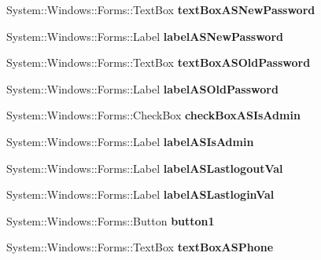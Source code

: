 \begin{DoxyCompactItemize}
System\+::\+Windows\+::\+Forms\+::\+Text\+Box {\bfseries text\+Box\+A\+S\+New\+Password}
\item 
\hypertarget{class_magazyn_1_1_magazin_afbf7075e643abcafff2222515f0fe7d4}{}\label{class_magazyn_1_1_magazin_afbf7075e643abcafff2222515f0fe7d4} 
System\+::\+Windows\+::\+Forms\+::\+Label {\bfseries label\+A\+S\+New\+Password}
\item 
\hypertarget{class_magazyn_1_1_magazin_a8aaa9dec27f0c20fff72fdb22c166982}{}\label{class_magazyn_1_1_magazin_a8aaa9dec27f0c20fff72fdb22c166982} 
System\+::\+Windows\+::\+Forms\+::\+Text\+Box {\bfseries text\+Box\+A\+S\+Old\+Password}
\item 
\hypertarget{class_magazyn_1_1_magazin_a015a4124ecc234517d562b01a70a0199}{}\label{class_magazyn_1_1_magazin_a015a4124ecc234517d562b01a70a0199} 
System\+::\+Windows\+::\+Forms\+::\+Label {\bfseries label\+A\+S\+Old\+Password}
\item 
\hypertarget{class_magazyn_1_1_magazin_a471146cf147a853a3861c6085941bfb6}{}\label{class_magazyn_1_1_magazin_a471146cf147a853a3861c6085941bfb6} 
System\+::\+Windows\+::\+Forms\+::\+Check\+Box {\bfseries check\+Box\+A\+S\+Is\+Admin}
\item 
\hypertarget{class_magazyn_1_1_magazin_a7453ce0dd90c261a59e253559de99e4b}{}\label{class_magazyn_1_1_magazin_a7453ce0dd90c261a59e253559de99e4b} 
System\+::\+Windows\+::\+Forms\+::\+Label {\bfseries label\+A\+S\+Is\+Admin}
\item 
\hypertarget{class_magazyn_1_1_magazin_a820d5e1d9e3cfa30d83770b34de559f2}{}\label{class_magazyn_1_1_magazin_a820d5e1d9e3cfa30d83770b34de559f2} 
System\+::\+Windows\+::\+Forms\+::\+Label {\bfseries label\+A\+S\+Lastlogout\+Val}
\item 
\hypertarget{class_magazyn_1_1_magazin_af7df9e9e7939f4175f601f463baa95e0}{}\label{class_magazyn_1_1_magazin_af7df9e9e7939f4175f601f463baa95e0} 
System\+::\+Windows\+::\+Forms\+::\+Label {\bfseries label\+A\+S\+Lastlogin\+Val}
\item 
\hypertarget{class_magazyn_1_1_magazin_a5a4d8ec5f251f1cc3200d12214aa8986}{}\label{class_magazyn_1_1_magazin_a5a4d8ec5f251f1cc3200d12214aa8986} 
System\+::\+Windows\+::\+Forms\+::\+Button {\bfseries button1}
\item 
\hypertarget{class_magazyn_1_1_magazin_a3f923bc8ed59a43765304c4afb233958}{}\label{class_magazyn_1_1_magazin_a3f923bc8ed59a43765304c4afb233958} 
System\+::\+Windows\+::\+Forms\+::\+Text\+Box {\bfseries text\+Box\+A\+S\+Phone}
\item 
\hypertarget{class_magazyn_1_1_magazin_aa012e8287c8b2f582495109c5b8b5425}{}\label{class_magazyn_1_1_magazin_aa012e8287c8b2f582495109c5b8b5425} 

\end{DoxyCompactItemize}
